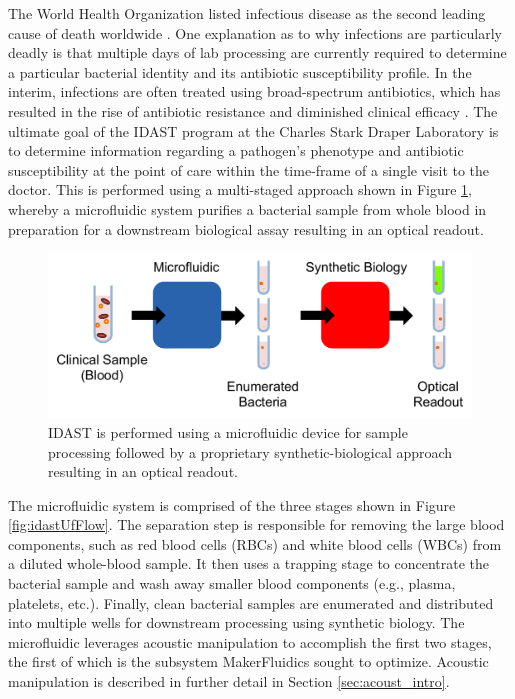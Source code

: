 The World Health Organization listed infectious disease as the second leading cause of death worldwide \cite{world2004world}. One explanation as to why infections are particularly deadly is that multiple days of lab processing are currently required to determine a particular bacterial identity and its antibiotic susceptibility profile. In the interim, infections are often treated using broad-spectrum antibiotics, which has resulted in the rise of antibiotic resistance and diminished clinical efficacy \cite{laxminarayan2013antibiotic}. The ultimate goal of the IDAST program at the Charles Stark Draper Laboratory is to determine information regarding a pathogen's phenotype and antibiotic susceptibility at the point of care within the time-frame of a single visit to the doctor. This is performed using a multi-staged approach shown in Figure \ref{fig:idastFlow}, whereby a microfluidic system purifies a bacterial sample from whole blood in preparation for a downstream biological assay resulting in an optical readout.

\begin{figure}[h]
  \begin{minipage}[t]{0.99\linewidth}\centering
    \includegraphics[width=13cm]{idastFlow.pdf}
    \medskip
  \end{minipage}\hfill
  \caption[System-level view of IDAST]{IDAST is performed using a microfluidic device for sample processing followed by a proprietary synthetic-biological approach resulting in an optical readout.}
    \label{fig:idastFlow}
\end{figure}

The microfluidic system is comprised of the three stages shown in Figure \ref{fig:idastUfFlow}. The separation step is responsible for removing the large blood components, such as red blood cells (RBCs) and white blood cells (WBCs) from a diluted whole-blood sample. It then uses a trapping stage to concentrate the bacterial sample and wash away smaller blood components (e.g., plasma, platelets, etc.). Finally, clean bacterial samples are enumerated and distributed into multiple wells for downstream processing using synthetic biology. The microfluidic leverages acoustic manipulation to accomplish the first two stages, the first of which is the subsystem MakerFluidics sought to optimize. Acoustic manipulation is described in further detail in Section \ref{sec:acoust_intro}.


